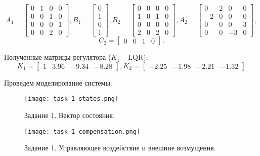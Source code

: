 \begin{equation*}
    A_1 = \begin{bmatrix}
        0 & 1 & 0 & 0 \\
        0 & 0 & 1 & 0 \\
        0 & 0 & 0 & 1 \\
        0 & 0 & 2 & 0
    \end{bmatrix}, 
    B_1 = \begin{bmatrix}
        0 \\ 1 \\ 0 \\ 1
    \end{bmatrix},
    B_2 = \begin{bmatrix}
        0 & 0 & 0 & 0 \\
        1 & 0 & 1 & 0 \\
        0 & 0 & 0 & 0 \\
        2 & 0 & 2 & 0
    \end{bmatrix}, 
    A_2 = \begin{bmatrix}
        0 & 2 & 0 & 0 \\
        -2 & 0 & 0 & 0 \\
        0 & 0 & 0 & 3 \\
        0 & 0 & -3 & 0
    \end{bmatrix}, 
\end{equation*}
\begin{equation*}
    C_2 = \begin{bmatrix}
        0 & 0 & 1 & 0
    \end{bmatrix}.
\end{equation*}

Полученные матрицы регулятора ($K_1$ -- LQR):
\begin{equation*}
    K_1 = \begin{bmatrix}
        1 & 3.96 & -9.34 & -8.28
    \end{bmatrix},
    K_2 = \begin{bmatrix}
        -2.25 & -1.98 & -2.21 & -1.32
    \end{bmatrix}
\end{equation*}

Проведем моделирование системы:

\begin{figure}[h]
    \centering
    \texttt{[image: task\_1\_states.png]}
    \caption{\label{fig:task4_3_2}Задание 1. Вектор состояния.}
\end{figure}

\begin{figure}[]
    \centering
    \texttt{[image: task\_1\_compensation.png]}
    \caption{\label{fig:task4_3_2}Задание 1. Управляющее воздействие и внешние возмущения.}
\end{figure}

